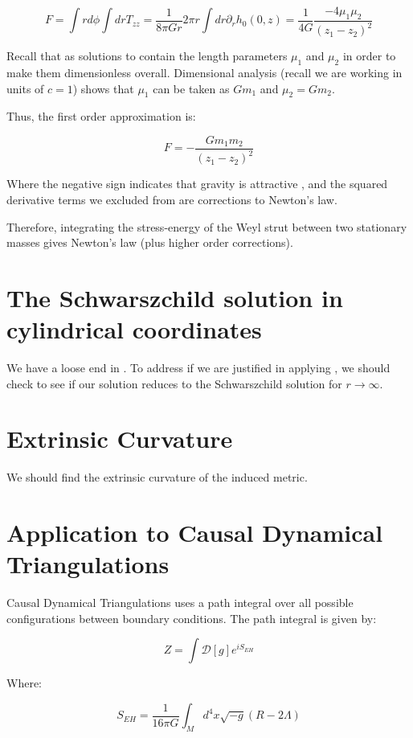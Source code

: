 \documentclass{article}
\begin{document}
\begin{equation}
F=\int rd\phi\int dr T_{zz}=\frac{1}{8\pi Gr}2\pi r\int dr\partial_{r}h_0(0,z)=\frac{1}{4G}\frac{-4\mu_1\mu_2}{\left(z_1-z_2\right)^2}
\end{equation}

Recall that  as solutions to  contain the length parameters $\mu_1$ and $\mu_2$ in order to make them dimensionless overall. Dimensional analysis (recall we are working in units of $c=1$) shows that $\mu_1$ can be taken as $Gm_{1}$ and $\mu_2=Gm_2$.

Thus, the first order approximation is:

\begin{equation}
F=-\frac{Gm_{1}m_{2}}{\left(z_{1}-z_{2}\right)^{2}}
\end{equation}

Where the negative sign indicates that gravity is attractive \cite{carroll2003spacetime}, and the squared derivative terms we excluded from  are corrections to Newton's law.

Therefore, integrating the stress-energy of the Weyl strut between two stationary masses gives Newton's law (plus higher order corrections).

\section{The Schwarszchild solution in cylindrical coordinates}
\label{sec:schwarszchild}

We have a loose end in . To address if we are justified in applying , we should check to see if our solution reduces to the Schwarszchild solution for $r\rightarrow\infty$.

\section{Extrinsic Curvature}

We should find the extrinsic curvature of the induced metric.

\section{Application to Causal Dynamical Triangulations}

Causal Dynamical Triangulations uses a path integral over all possible
configurations between boundary conditions. The path integral is given
by:

\begin{equation}
  \label{eq:path-integral}
Z=\int \mathcal{D}[g]e^{iS_ {EH}}
\end{equation}

Where:

\begin{equation}
  \label{eq:einstein-hilbert-action}
  S_{EH}=\frac{1}{16\pi G}\int_{M}d^4 x\sqrt{-g}\left(R-2\Lambda\right)
\end{equation}




\end{document}
